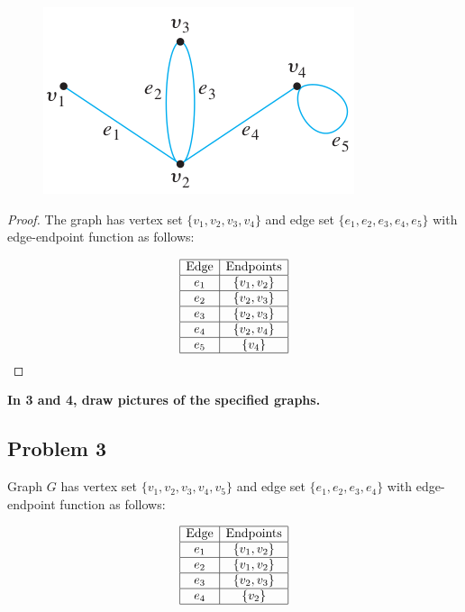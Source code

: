 \documentclass[14pt]{extarticle}
\begin{document}
\begin{figure}[ht!]
\centering
\includegraphics[scale=0.5]{../images/1.4.2.png}
\end{figure}

\begin{proof}
The graph has vertex set $\{v_1, v_2, v_3, v_4\}$ and edge set
$\{e_1, e_2, e_3, e_4, e_5\}$ with edge-endpoint function as follows:

$$
\begin{array}{|c|c|}
\hline
\text{Edge} & \text{Endpoints} \\
\hline
e_1 & \{v_1, v_2\} \\
\hline
e_2 & \{v_2, v_3\} \\
\hline
e_3 & \{v_2, v_3\} \\
\hline
e_4 & \{v_2, v_4\} \\
\hline
e_5 & \{v_4\} \\
\hline
\end{array}
$$
\end{proof}

{\bf In 3 and 4, draw pictures of the specified graphs.}

\subsection{Problem 3}
Graph $G$ has vertex set $\{v_1, v_2, v_3, v_4, v_5\}$ and edge set $\{e_1,
e_2, e_3, e_4\}$ with edge-endpoint function as follows:

$$
\begin{array}{|c|c|}
\hline
\text{Edge} & \text{Endpoints} \\
\hline
e_1 & \{v_1, v_2\} \\
\hline
e_2 & \{v_1, v_2\} \\
\hline
e_3 & \{v_2, v_3\} \\
\hline
e_4 & \{v_2\} \\
\hline
\end{array}
$$
\end{document}
